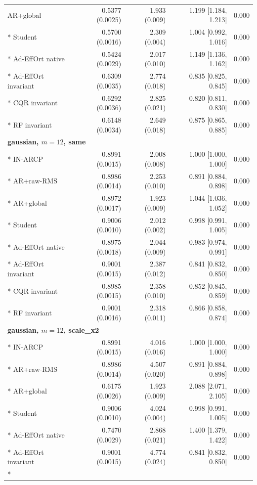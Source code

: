 \begin{longtable}{lrrrr}
AR+global & 0.5377 (0.0025) & 1.933 (0.009) & 1.199 [1.184, 1.213] & 0.000 \\*
Student & 0.5700 (0.0016) & 2.309 (0.004) & 1.004 [0.992, 1.016] & 0.000 \\*
Ad-EffOrt native & 0.5424 (0.0029) & 2.017 (0.010) & 1.149 [1.136, 1.162] & 0.000 \\*
Ad-EffOrt invariant & 0.6309 (0.0035) & 2.774 (0.018) & 0.835 [0.825, 0.845] & 0.000 \\*
CQR invariant & 0.6292 (0.0036) & 2.825 (0.021) & 0.820 [0.811, 0.830] & 0.000 \\*
RF invariant & 0.6148 (0.0034) & 2.649 (0.018) & 0.875 [0.865, 0.885] & 0.000 \\
\midrule
\multicolumn{5}{l}{\textbf{gaussian, $m=12$, same}}\\*
IN-ARCP & 0.8991 (0.0015) & 2.008 (0.008) & 1.000 [1.000, 1.000] & 0.000 \\*
AR+raw-RMS & 0.8986 (0.0014) & 2.253 (0.010) & 0.891 [0.884, 0.898] & 0.000 \\*
AR+global & 0.8972 (0.0017) & 1.923 (0.009) & 1.044 [1.036, 1.052] & 0.000 \\*
Student & 0.9006 (0.0010) & 2.012 (0.002) & 0.998 [0.991, 1.005] & 0.000 \\*
Ad-EffOrt native & 0.8975 (0.0018) & 2.044 (0.009) & 0.983 [0.974, 0.991] & 0.000 \\*
Ad-EffOrt invariant & 0.9001 (0.0015) & 2.387 (0.012) & 0.841 [0.832, 0.850] & 0.000 \\*
CQR invariant & 0.8985 (0.0015) & 2.358 (0.010) & 0.852 [0.845, 0.859] & 0.000 \\*
RF invariant & 0.9001 (0.0016) & 2.318 (0.011) & 0.866 [0.858, 0.874] & 0.000 \\
\midrule
\multicolumn{5}{l}{\textbf{gaussian, $m=12$, scale\_x2}}\\*
IN-ARCP & 0.8991 (0.0015) & 4.016 (0.016) & 1.000 [1.000, 1.000] & 0.000 \\*
AR+raw-RMS & 0.8986 (0.0014) & 4.507 (0.020) & 0.891 [0.884, 0.898] & 0.000 \\*
AR+global & 0.6175 (0.0026) & 1.923 (0.009) & 2.088 [2.071, 2.105] & 0.000 \\*
Student & 0.9006 (0.0010) & 4.024 (0.004) & 0.998 [0.991, 1.005] & 0.000 \\*
Ad-EffOrt native & 0.7470 (0.0029) & 2.868 (0.021) & 1.400 [1.379, 1.422] & 0.000 \\*
Ad-EffOrt invariant & 0.9001 (0.0015) & 4.774 (0.024) & 0.841 [0.832, 0.850] & 0.000 \\*

\end{longtable}
